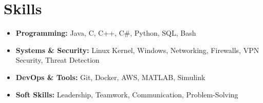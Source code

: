 \section{Skills}
\begin{itemize}
    \item \textbf{Programming:} Java, C, C++, C#, Python, SQL, Bash
    \item \textbf{Systems \& Security:} Linux Kernel, Windows, Networking, Firewalls, VPN Security, Threat Detection
    \item \textbf{DevOps \& Tools:} Git, Docker, AWS, MATLAB, Simulink
    \item \textbf{Soft Skills:} Leadership, Teamwork, Communication, Problem-Solving
\end{itemize}

